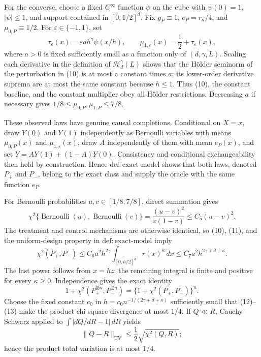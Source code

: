 For the converse, choose a fixed \(C^\infty\) function \(\psi\) on the cube with \(\psi(0)=1\), \(|\psi|\leq1\), and support contained in \([0,1/2]^d\).  Fix \(g_P\equiv1\), \(e_P=r_\kappa/4\), and \(\mu_{0,P}\equiv1/2\).  For \(\varepsilon\in\{-1,1\}\), set
\[
 \tau_\varepsilon(x)=\varepsilon a h^\gamma\psi(x/h),
 \qquad \mu_{1,\varepsilon}(x)=\frac12+\tau_\varepsilon(x),
 \tag{10}
\]
where \(a>0\) is fixed sufficiently small as a function only of \((d,\gamma,L)\).  Scaling each derivative in the definition of \(\mathcal H_d^\gamma(L)\) shows that the H\"older seminorm of the perturbation in (10) is at most a constant times \(a\); its lower-order derivative suprema are at most the same constant because \(h\leq1\).  Thus (10), the constant baseline, and the constant multiplier obey all H\"older restrictions.  Decreasing \(a\) if necessary gives \(1/8\leq\mu_{0,P},\mu_{1,P}\leq7/8\).

These observed laws have genuine causal completions.  Conditional on \(X=x\), draw \(Y(0)\) and \(Y(1)\) independently as Bernoulli variables with means \(\mu_{0,P}(x)\) and \(\mu_{1,\varepsilon}(x)\), draw \(A\) independently of them with mean \(e_P(x)\), and set \(Y=AY(1)+(1-A)Y(0)\).  Consistency and conditional exchangeability then hold by construction.  Hence \(\mathrm{def:exact\mbox{-}model}\) shows that both laws, denoted \(P_+\) and \(P_-\), belong to the exact class and supply the oracle with the same function \(e_P\).

For Bernoulli probabilities \(u,v\in[1/8,7/8]\), direct summation gives
\[
 \chi^2\{\operatorname{Bernoulli}(u),\operatorname{Bernoulli}(v)\}
 =\frac{(u-v)^2}{v(1-v)}\leq C_5(u-v)^2.
 \tag{11}
\]
The treatment and control mechanisms are otherwise identical, so (10), (11), and the uniform-design property in \(\mathrm{def:exact\mbox{-}model}\) imply
\[
 \chi^2(P_+,P_-)
 \leq C_6a^2h^{2\gamma}\int_{[0,h/2]^d}r(x)^\kappa\,dx
 \leq C_7a^2h^{2\gamma+d+\kappa}.
 \tag{12}
\]
The last power follows from \(x=hz\); the remaining integral is finite and positive for every \(\kappa\geq0\).  Independence gives the exact identity
\[
 1+\chi^2(P_+^{\otimes n},P_-^{\otimes n})
 =\{1+\chi^2(P_+,P_-)\}^n.
 \tag{13}
\]
Choose the fixed constant \(c_0\) in \(h=c_0n^{-1/(2\gamma+d+\kappa)}\) sufficiently small that (12)--(13) make the product chi-square divergence at most \(1/4\).  If \(Q\ll R\), Cauchy--Schwarz applied to \(\int|dQ/dR-1|\,dR\) yields
\[
 \lVert Q-R\rVert_{\mathrm{TV}}\leq\frac12\sqrt{\chi^2(Q,R)};
\]
hence the product total variation is at most \(1/4\).

